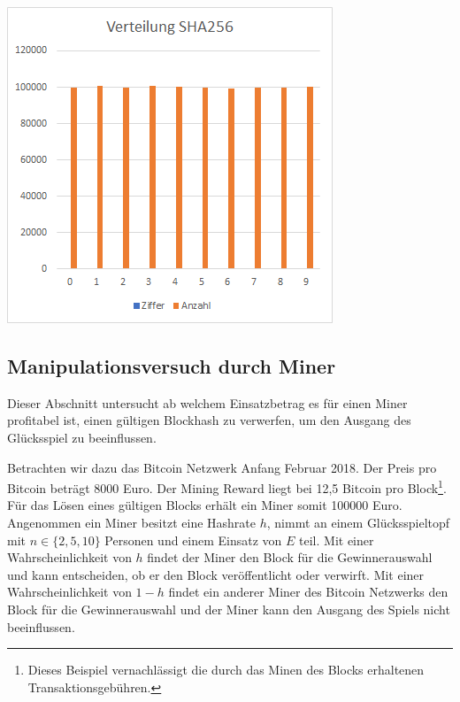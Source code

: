 \begin{minipage}{0.5\textwidth}
\includegraphics[width=\textwidth]{Figures/verteilung_sha256}
\centering
\decoRule
{}
\label{fig:verteilung_sha256}
\end{minipage}


\subsection{Manipulationsversuch durch Miner} \label{btc_eval_miner}
Dieser Abschnitt untersucht ab welchem Einsatzbetrag es für einen Miner profitabel ist, einen gültigen Blockhash zu verwerfen, um den Ausgang des Glücksspiel zu beeinflussen.

Betrachten wir dazu das Bitcoin Netzwerk Anfang Februar 2018. Der Preis pro Bitcoin beträgt 8000 Euro. Der Mining Reward liegt bei 12,5 Bitcoin pro Block\footnote{Dieses Beispiel vernachlässigt die durch das Minen des Blocks erhaltenen Transaktionsgebühren.}. Für das Lösen eines gültigen Blocks erhält ein Miner somit 100000 Euro.
Angenommen ein Miner besitzt eine Hashrate $h$, nimmt an einem Glücksspieltopf mit $n\in\{2, 5, 10\}$ Personen und einem Einsatz von $E$ teil. Mit einer Wahrscheinlichkeit von $h$ findet der Miner den Block für die Gewinnerauswahl und kann entscheiden, ob er den Block veröffentlicht oder verwirft. Mit einer Wahrscheinlichkeit von $1-h$ findet ein anderer Miner des Bitcoin Netzwerks den Block für die Gewinnerauswahl und der Miner kann den Ausgang des Spiels nicht beeinflussen.

